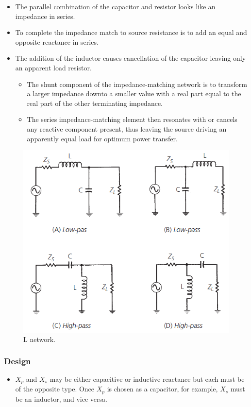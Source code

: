 \begin{itemize}
	\item The parallel combination of the capacitor and resistor looks like an impedance in series.
	\item To complete the impedance match to source resistance is to add an equal and opposite reactance in series.
	\item The addition of the inductor causes cancellation of the capacitor leaving only an apparent load resistor.
	\begin{itemize}
		\item The shunt component of the impedance-matching network is to transform a larger impedance downto a smaller value with a real part equal to the real part of the other terminating impedance.
		\item The series impedance-matching element then resonates with or cancels any reactive component present, thus leaving the source driving an apparently equal load for optimum power transfer.
	\end{itemize}
\end{itemize}


\begin{figure} [H]
	\centering
	\includegraphics[width=0.8\linewidth]{graphics/26.png}
	\caption{L network.}
	\label{fig:26}
\end{figure}

\newpage\subsubsection{Design}

\begin{itemize}
	\item $X_p$ and $X_s$ may be either capacitive or inductive reactance but each must be of the opposite type. Once $X_p$ is chosen as a capacitor, for example, $X_s$ must be an inductor, and vice versa.
\end{itemize}

